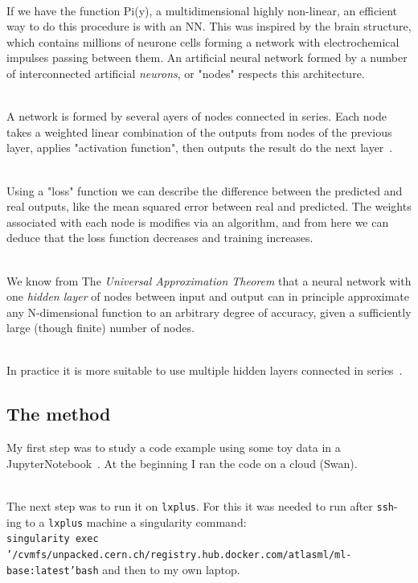 \documentclass[a4paper,11pt,twoside]{article}
\begin{document}
\ \\If we have the function Pi(y), a multidimensional highly non-linear, an efficient way to do this procedure is with an NN. This was inspired by the brain structure, which contains millions of neurone cells forming a network with electrochemical impulses passing between them. An artificial neural network formed by a number of interconnected artificial \emph{neurons}, or "nodes" respects this architecture. 

\ \\A network is formed by several ayers of nodes connected in series. Each node takes a weighted linear combination of the outputs from nodes of the previous layer, applies "activation function", then outputs the result do the next layer~\cite{AndrewNg}.

\ \\Using a "loss" function we can describe the difference between the predicted and real outputs, like the mean squared error between real and predicted. The weights associated with each node is modifies via an algorithm, and from here we can deduce that the loss function decreases and training increases.

\ \\We know from The \emph{Universal Approximation Theorem} that a neural network with one \emph{hidden layer} of nodes between input and output can in principle approximate any N-dimensional function to an arbitrary degree of accuracy, given a sufficiently large (though finite) number of nodes. 

\ \\In practice it is more suitable to use multiple hidden layers connected in series~\cite{AndrewNg}.

\subsection{The method}

My first step was to study a code example using some toy data in a JupyterNotebook~\cite{glazov}. At the beginning I ran the code on a cloud (Swan). 

\ \\The next step was to run it on \texttt{lxplus}. For this it was needed to run after \texttt{ssh}-ing to a \texttt{lxplus} machine a singularity command: \\
{\small \texttt{singularity exec '/cvmfs/unpacked.cern.ch/registry.hub.docker.com/atlasml/ml-base:latest'bash}} and then to my own laptop.
\end{document}
